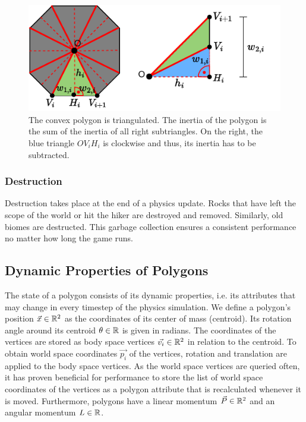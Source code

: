 \begin{figure}[h!]
  \centering
  \includegraphics[width = .8\linewidth]{figures/physics/inertia.pdf}
  \caption{The convex polygon is triangulated. The inertia of the polygon is the sum of the inertia of all right subtriangles. On the right, the blue triangle $OV_iH_i$ is clockwise and thus, its inertia has to be subtracted.}
  \label{fig:inertia}
\end{figure}
\vspace{-2\abovedisplayskip}

\subsubsection{Destruction}

Destruction takes place at the end of a physics update.
Rocks that have left the scope of the world or hit the hiker are destroyed and removed.
Similarly, old biomes are destructed.
This garbage collection ensures a consistent performance no matter how long the game runs.  

\vspace{-\abovedisplayskip}
\subsection{Dynamic Properties of Polygons}

The state of a polygon consists of its dynamic properties, i.e. its attributes that may change in every timestep of the physics simulation.
We define a polygon's position $\vec{x} \in {\mathbb{R}}^{2}$ as the coordinates of its center of mass (centroid).
Its rotation angle around its centroid $\theta \in {\mathbb{R}}$ is given in radians.
The coordinates of the vertices are stored as body space vertices $\vec{v_i} \in {\mathbb{R}}^{2}$ in relation to the centroid.
To obtain world space coordinates $\vec{p_i}$ of the vertices, rotation and translation are applied to the body space vertices. 
As the world space vertices are queried often, it has proven beneficial for performance to store the list of world space coordinates of the vertices as a polygon attribute that is recalculated whenever it is moved. 
Furthermore, polygons have a linear momentum $\vec{P} \in {\mathbb{R}}^{2}$ and an angular momentum $L \in {\mathbb{R}}$.

